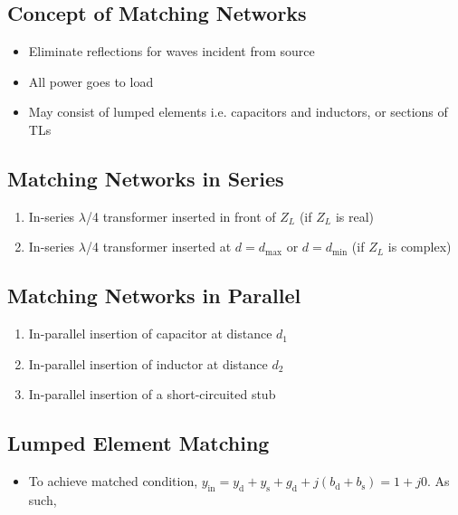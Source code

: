 \documentclass[a4paper]{article}
\begin{document}
\subsection{Concept of Matching Networks}
\begin{itemize}
    \item Eliminate reflections for waves incident from source
    \item All power goes to load
    \item May consist of lumped elements i.e. capacitors and inductors, or sections of TLs
\end{itemize}

\subsection{Matching Networks in Series}
\begin{enumerate}
    \item In-series $\lambda$/4 transformer inserted in front of $Z_L$ \quad (if $Z_L$ is real)
    \item In-series $\lambda$/4 transformer inserted at $d = d_\text{max}$ or $d = d_\text{min}$ \quad (if $Z_L$ is complex)
\end{enumerate}

\subsection{Matching Networks in Parallel}
\begin{enumerate}
    \item In-parallel insertion of capacitor at distance $d_1$
    \item In-parallel insertion of inductor at distance $d_2$
    \item In-parallel insertion of a short-circuited stub
\end{enumerate}

\subsection{Lumped Element Matching}
\begin{itemize}
    \item To achieve matched condition, $y_\text{in} = y_\text{d}+y_\text{s}+g_\text{d}+j(b_\text{d}+b_\text{s})= 1+j0$. As such,
    \begin{center}
    \end{center}
\end{itemize}
\end{document}
